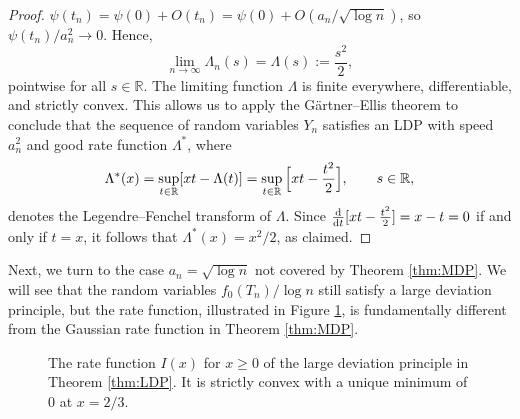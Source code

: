 \documentclass[11pt,a4paper]{article}
\numberwithin{equation}{section}
\newcommand{\dint}{\textup{d}}
\def\RR{\mathbb{R}}
\begin{document}
\begin{proof}
$\psi(t_n)=\psi(0)+O(t_n)=\psi(0)+O(a_n/\sqrt{\log n})$, so $\psi(t_n)/a_n^2\to 0$. Hence,
\begin{equation*}
\lim_{n\to\infty}\Lambda_n(s) = \Lambda(s):=\frac{s^2}{2},
\end{equation*}
pointwise for all $s\in\RR$. The limiting function $\Lambda$ is  finite everywhere, differentiable, and strictly convex. This allows us to apply the Gärtner--Ellis theorem \cite[Theorem 2.3.6]{DZlargeDeviations} to conclude that the sequence of random variables $Y_n$ satisfies an LDP with speed $a_n^2$ and good rate function $\Lambda^*$, where
$$
\Lambda^{*}(x) = \sup_{t\in\RR}[xt-\Lambda(t)]=\sup_{t\in\RR}\Big[xt-{t^2\over 2}\Big],\qquad s\in\RR,
$$
denotes the Legendre--Fenchel transform of $\Lambda$. Since ${\dint\over\dint t}[xt-{t^2\over 2}]=x-t=0$ if and only if $t=x$, it follows that $\Lambda^{*}(x)=x^2/2$, as claimed.
\end{proof}

Next, we turn to the case $a_n=\sqrt{\log n}$ not covered by Theorem \ref{thm:MDP}. We will see that the random variables $f_0(T_n)/\log n$ still satisfy a large deviation principle, but the rate function, illustrated in Figure \ref{fig:LDP}, is fundamentally different from the Gaussian rate function in Theorem \ref{thm:MDP}.

\begin{figure}[t]
\centering
{}
\caption{The rate function $I(x)$ for $x\geq 0$ of the large deviation principle in Theorem \ref{thm:LDP}. It is strictly convex with a unique minimum of $0$ at $x=2/3$.}
\label{fig:LDP}
\end{figure}
\end{document}
